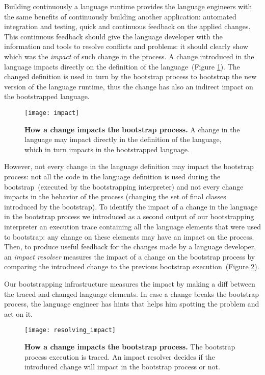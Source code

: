 Building continuously a language runtime provides the language engineers with the same benefits of continuously building another application: automated integration and testing, quick and continuous feedback on the applied changes. This continuous feedback should give the language developer with the information and tools to resolve conflicts and problems: it should clearly show which was the \emph{impact} of such change in the process. A change introduced in the language impacts directly on the definition of the language~(Figure \ref{fig:impact}). The changed definition is used in turn by the bootstrap process to bootstrap the new version of the language runtime, thus the change has also an indirect impact on the bootstrapped language. 

\begin{figure}[ht]
\center
\texttt{[image: impact]}
\caption{\textbf{How a change impacts the bootstrap process.} A change in the language may impact directly in the definition of the language, which in turn impacts in the bootstrapped language.\label{fig:impact}}
\end{figure}

However, not every change in the language definition may impact the bootstrap process: not all the code in the language definition is used during the bootstrap~(\ie executed by the bootstrapping interpreter) and not every change impacts in the behavior of the process (\eg changing the set of final classes introduced by the bootstrap). To identify the impact of a change in the language in the bootstrap process we introduced as a second output of our bootstrapping interpreter an execution trace containing all the language elements that were used to bootstrap: any change on these elements may have an impact on the process. Then, to produce useful feedback for the changes made by a language developer, an \emph{impact resolver} measures the impact of a change on the bootstrap process by comparing the introduced change to the previous bootstrap execution~(Figure \ref{fig:resolving_impact}).

Our bootstrapping infrastructure measures the impact by making a diff between the traced and changed language elements. In case a change breaks the bootstrap process, the language engineer has hints that helps him spotting the problem and act on it.

\begin{figure}[ht]
\center
\texttt{[image: resolving\_impact]}
\caption{\textbf{How a change impacts the bootstrap process.} The bootstrap process execution is traced. An impact resolver decides if the introduced change will impact in the bootstrap process or not.\label{fig:resolving_impact}}
\end{figure}

